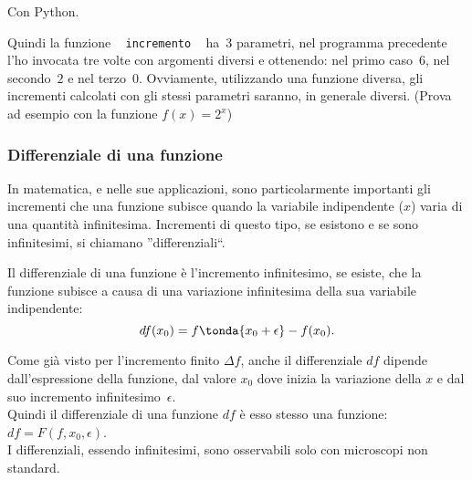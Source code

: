 \ifcoding
Con Python.
\fi

Quindi la funzione ~ \texttt{incremento} ~ ha~$3$ 
parametri, nel programma precedente l'ho invocata tre volte con argomenti 
diversi e ottenendo: nel primo caso~$6$, nel secondo~$2$ e nel terzo~$0$. 
Ovviamente, utilizzando una funzione diversa, gli incrementi calcolati con 
gli stessi parametri saranno, in generale diversi. (Prova ad esempio 
con la funzione \(f(x)= 2^x\))


\subsubsection{Differenziale di una funzione}
\label{subsubsec:diff01_parteprincipale}

In matematica, e nelle sue applicazioni, sono particolarmente importanti 
gli incrementi che una funzione subisce quando la variabile 
indipendente (\(x\)) varia di una quantità infinitesima. Incrementi di 
questo tipo, se esistono e se sono infinitesimi, si chiamano ''differenziali``.

\begin{definizione}
 Il differenziale di una funzione è l'incremento infinitesimo, se esiste, 
 che la funzione subisce a causa di una variazione infinitesima della sua 
variabile indipendente:
\[df(x_0) = f \tonda{x_0 + \epsilon} - f(x_0).\]
\end{definizione}

Come già visto per l'incremento finito $\Delta f$, anche il differenziale $df$ 
dipende dall'espressione della funzione, dal valore $x_0$ dove inizia la 
variazione della $x$ e dal suo incremento infinitesimo~$\epsilon$.\\
Quindi il differenziale di una funzione \(df\) è esso stesso  una funzione:
\(df=F(f, x_0, \epsilon)\).\\
I differenziali, essendo infinitesimi, sono osservabili solo con 
microscopi non standard.\\

